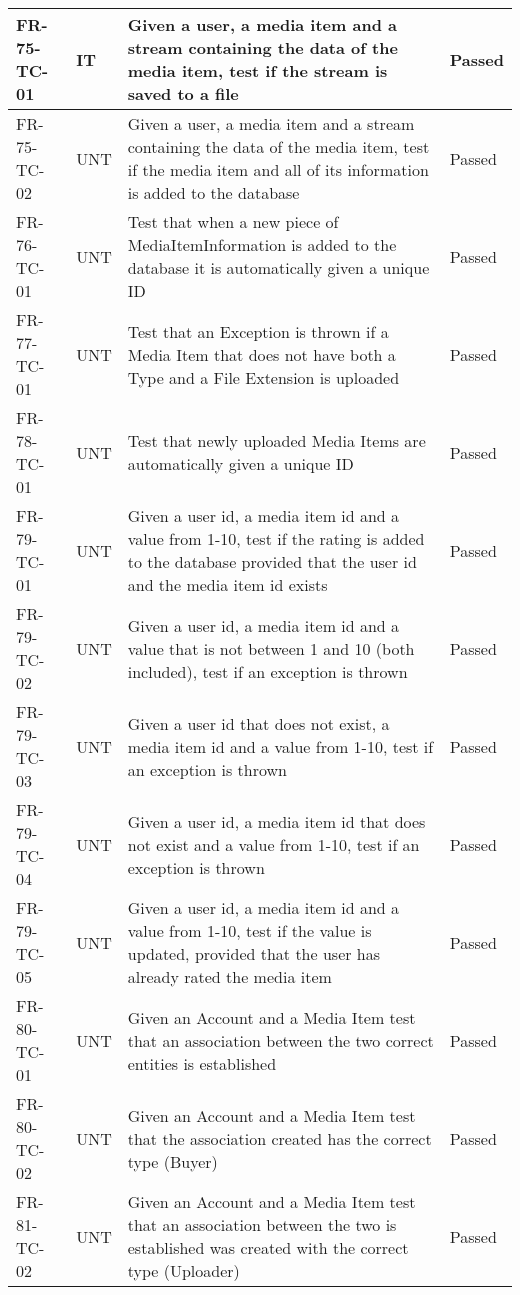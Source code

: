 \documentclass[../report.tex]{subfiles}
\begin{document}
\begin{longtable}{|L{2.1cm}|L{1cm}|L{12.4cm}|L{1.4cm}|}
FR-75-TC-01&IT&Given a user, a media item and a stream containing the data of the media item, test if the stream is saved to a file&Passed  \\ \hline
FR-75-TC-02&UNT&Given a user, a media item and a stream containing the data of the media item, test if the media item and all of its information is added to the database&Passed  \\ \hline
FR-76-TC-01&UNT&Test that when a new piece of MediaItemInformation is added to the database it is automatically given a unique ID&Passed  \\ \hline
FR-77-TC-01&UNT&Test that an Exception is thrown if a Media Item that does not have both a Type and a File Extension is uploaded&Passed  \\ \hline
FR-78-TC-01&UNT&Test that newly uploaded Media Items are automatically given a unique ID&Passed  \\ \hline
FR-79-TC-01&UNT&Given a user id, a media item id and a value from 1-10, test if the rating is added to the database provided that the user id and the media item id exists&Passed  \\ \hline
FR-79-TC-02&UNT&Given a user id, a media item id and a value that is not between 1 and 10 (both included), test if an exception is thrown&Passed  \\ \hline
FR-79-TC-03&UNT&Given a user id that does not exist, a media item id and a value from 1-10, test if an exception is thrown&Passed  \\ \hline
FR-79-TC-04&UNT&Given a user id, a media item id that does not exist and a value from 1-10, test if an exception is thrown&Passed  \\ \hline
FR-79-TC-05&UNT&Given a user id, a media item id and a value from 1-10, test if the value is updated, provided that the user has already rated the media item&Passed  \\ \hline
FR-80-TC-01&UNT&Given an Account and a Media Item test that an association between the two correct entities is established &Passed  \\ \hline
FR-80-TC-02&UNT&Given an Account and a Media Item test that the association created has the correct type (Buyer)&Passed  \\ \hline
FR-81-TC-02&UNT&Given an Account and a Media Item test that an association between the two is established was created with the correct type (Uploader)&Passed  \\ \hline

\end{longtable}
\end{document}
